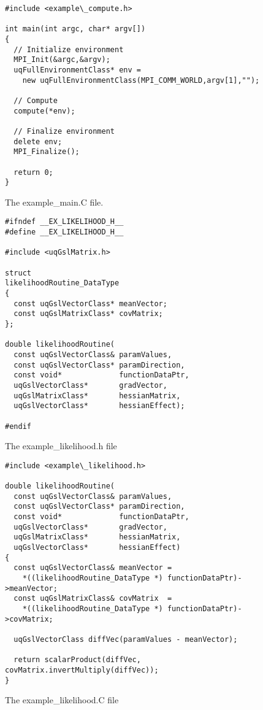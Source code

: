 \begin{figure}[h!]
\begin{center}
\begin{verbatim}
#include <example\_compute.h>

int main(int argc, char* argv[])
{
  // Initialize environment
  MPI_Init(&argc,&argv);
  uqFullEnvironmentClass* env =
    new uqFullEnvironmentClass(MPI_COMM_WORLD,argv[1],"");

  // Compute
  compute(*env);

  // Finalize environment
  delete env;
  MPI_Finalize();

  return 0;
}
\end{verbatim}
\end{center}
\caption{
The example\_main.C file.
}
\label{fig-main-c}
\end{figure}

\begin{figure}[h!]
\begin{center}
\begin{verbatim}
#ifndef __EX_LIKELIHOOD_H__
#define __EX_LIKELIHOOD_H__

#include <uqGslMatrix.h>

struct
likelihoodRoutine_DataType
{
  const uqGslVectorClass* meanVector;
  const uqGslMatrixClass* covMatrix;
};

double likelihoodRoutine(
  const uqGslVectorClass& paramValues,
  const uqGslVectorClass* paramDirection,
  const void*             functionDataPtr,
  uqGslVectorClass*       gradVector,
  uqGslMatrixClass*       hessianMatrix,
  uqGslVectorClass*       hessianEffect);

#endif
\end{verbatim}
\end{center}
\caption{
The example\_likelihood.h file
}
\label{fig-like-h}
\end{figure}

\begin{figure}[h!]
\begin{center}
\begin{verbatim}
#include <example\_likelihood.h>

double likelihoodRoutine(
  const uqGslVectorClass& paramValues,
  const uqGslVectorClass* paramDirection,
  const void*             functionDataPtr,
  uqGslVectorClass*       gradVector,
  uqGslMatrixClass*       hessianMatrix,
  uqGslVectorClass*       hessianEffect)
{
  const uqGslVectorClass& meanVector =
    *((likelihoodRoutine_DataType *) functionDataPtr)->meanVector;
  const uqGslMatrixClass& covMatrix  =
    *((likelihoodRoutine_DataType *) functionDataPtr)->covMatrix;

  uqGslVectorClass diffVec(paramValues - meanVector);

  return scalarProduct(diffVec, covMatrix.invertMultiply(diffVec));
}
\end{verbatim}
\end{center}
\caption{
The example\_likelihood.C file
}
\label{fig-like-c}
\end{figure}

